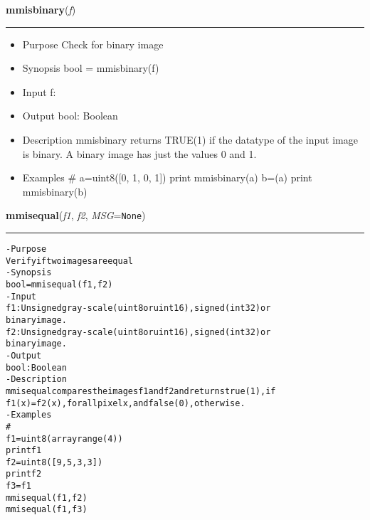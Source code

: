     \begin{boxedminipage}{\textwidth}

    \raggedright \textbf{mmisbinary}(\textit{f})

    \vspace{-1.5ex}

    \rule{\textwidth}{0.5\fboxrule}
    \begin{itemize}
    \setlength{\parskip}{0.6ex}
      \item Purpose Check for binary image

      \item Synopsis bool = mmisbinary(f)

      \item Input f:

      \item Output bool: Boolean

      \item Description mmisbinary returns TRUE(1) if the datatype of the 
        input image is binary. A binary image has just the values 0 and 
        1.

      \item Examples \# a=uint8([0, 1, 0, 1]) print mmisbinary(a) b=(a) print 
        mmisbinary(b)

    \end{itemize}

    \vspace{1ex}

    \end{boxedminipage}

    \label{multireg:num_pymorph:mmisequal}
    \vspace{0.5ex}

    \begin{boxedminipage}{\textwidth}

    \raggedright \textbf{mmisequal}(\textit{f1}, \textit{f2}, \textit{MSG}=\texttt{N\-o\-n\-e\-})

    \vspace{-1.5ex}

    \rule{\textwidth}{0.5\fboxrule}
\begin{alltt}
- Purpose
    Verify if two images are equal
- Synopsis
    bool = mmisequal(f1, f2)
- Input
    f1:  Unsigned gray-scale (uint8 or uint16), signed (int32) or
         binary image.
    f2:  Unsigned gray-scale (uint8 or uint16), signed (int32) or
         binary image.
- Output
    bool: Boolean
- Description
    mmisequal compares the images f1 and f2 and returns true (1), if
    f1(x)=f2(x) , for all pixel x , and false (0), otherwise.
- Examples
    \#
    f1 = uint8(arrayrange(4))
    print f1
    f2 = uint8([9, 5, 3, 3])
    print f2
    f3 = f1
    mmisequal(f1,f2)
    mmisequal(f1,f3)\end{alltt}

    \vspace{1ex}

    \end{boxedminipage}

